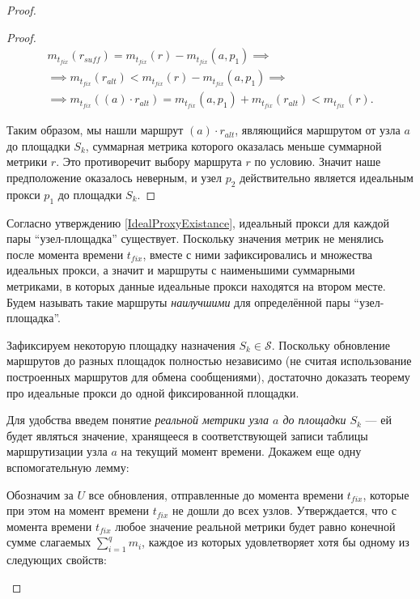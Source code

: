\begin{proof}
\begin{proof}
        \begin{equation*}
        \begin{aligned}
            m_{t_{fix}}(r_{suff}) = m_{t_{fix}}(r) - m_{t_{fix}}(a, p_1) \implies \\
            \implies m_{t_{fix}}(r_{alt}) < m_{t_{fix}}(r) - m_{t_{fix}}(a, p_1) \implies \\
            \implies m_{t_{fix}}((a) \cdot r_{alt}) = m_{t_{fix}}(a, p_1) + m_{t_{fix}}(r_{alt}) < m_{t_{fix}}(r).
        \end{aligned}
        \end{equation*}
        
        Таким образом, мы нашли маршрут $(a) \cdot r_{alt}$, являющийся маршрутом от узла $a$ до площадки $S_k$, суммарная метрика которого оказалась меньше суммарной метрики $r$. Это противоречит выбору маршрута $r$ по условию. Значит наше предположение оказалось неверным, и узел $p_2$ действительно является идеальным прокси $p_1$ до площадки $S_k$.
    \end{proof}
    
    Согласно утверждению \ref{IdealProxyExistance}, идеальный прокси для каждой пары \enquote{узел-площадка} существует. Поскольку значения метрик не менялись после момента времени $t_{fix}$, вместе с ними зафиксировались и множества идеальных прокси, а значит и маршруты с наименьшими суммарными метриками, в которых данные идеальные прокси находятся на втором месте. Будем называть такие маршруты \textit{наилучшими} для определённой пары \enquote{узел-площадка}.
    
    Зафиксируем некоторую площадку назначения $S_k \in \mathcal{S}$. Поскольку обновление маршрутов до разных площадок полностью независимо (не считая использование построенных маршрутов для обмена сообщениями), достаточно доказать теорему про идеальные прокси до одной фиксированной площадки.
    
    Для удобства введем понятие \textit{реальной метрики узла $a$ до площадки $S_k$} --- ей будет являться значение, хранящееся в соответствующей записи таблицы маршрутизации узла $a$ на текущий момент времени. Докажем еще одну вспомогательную лемму:
    
    \begin{lemma}
    \label{PossibleMetricValue}
        Обозначим за $U$ все обновления, отправленные до момента времени $t_{fix}$, которые при этом на момент времени $t_{fix}$ не дошли до всех узлов. Утверждается, что с момента времени $t_{fix}$ любое значение реальной метрики будет равно конечной сумме слагаемых $\displaystyle \sum_{i = 1}^q m_i$, каждое из которых удовлетворяет хотя бы одному из следующих свойств:
        

\end{lemma}
\end{proof}
